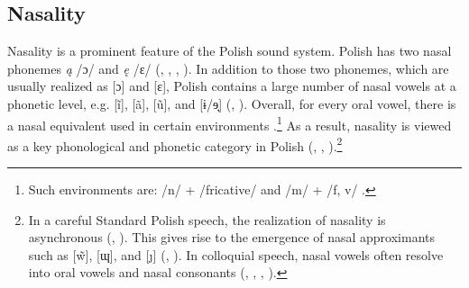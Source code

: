 \documentclass[output=paper,hidelinks]{langscibook}
\begin{document}
\subsection{Nasality}\label{sec:wymsorys:4.3}
Nasality is a prominent feature of the Polish sound system. Polish has two nasal phonemes \textit{ą} /ɔ/ and \textit{ę} /ɛ/ (\cite[297--298]{urbanczyk_encyklopedia_1991}, \citealt[659]{rothstein_polish_1993}, %
\citealt{bloch-rozmej_nasal_1997, gussmann_phonology_2007}, \cite[88, 100]{wagiel_fonematyka_2016}). In addition to those two phonemes, which are usually realized as [ɔ] and [ɛ], Polish contains a large number of nasal vowels at a phonetic level, e.g. [ĩ], [ã], [ũ], and [ɨ/ɘ̟] (\citealt[95]{bloch-rozmej_nasal_1997}, \cite[58--59, 61, 72]{strutynski_gramatyka_1998}). Overall, for every oral vowel, there is a nasal equivalent used in certain environments \citep[298]{urbanczyk_encyklopedia_1991}.\footnote{Such environments are: /n/ + /fricative/ and /m/ + /f, v/ \citep[298]{urbanczyk_encyklopedia_1991}.} As a result, nasality is viewed as a key phonological and phonetic category in Polish (\citealt[77]{bak_gramatyka_1997, strutynski_gramatyka_1998}, \citealt[269--287]{gussmann_phonology_2007}, \citealt{wagiel_fonematyka_2016}).\footnote{In a careful Standard Polish speech, the realization of nasality is asynchronous (\cite[297--298]{urbanczyk_encyklopedia_1991}, \citealt{bak_gramatyka_1997}). This gives rise to the emergence of nasal approximants such as [\~{w}], [ɰ], and [ȷ] (\citealt[660]{rothstein_polish_1993}, \citealt[270--271]{gussmann_phonology_2007}). In colloquial speech, nasal vowels often resolve into oral vowels and nasal consonants (\citealt[659]{rothstein_polish_1993}, \citealt{bak_gramatyka_1997, rubach_nasalization_1977, rowicka_nasal_1992}, %
\citealt[84--86]{bloch-rozmej_nasal_1997}, \citealt[271]{gussmann_phonology_2007}).}
\end{document}
